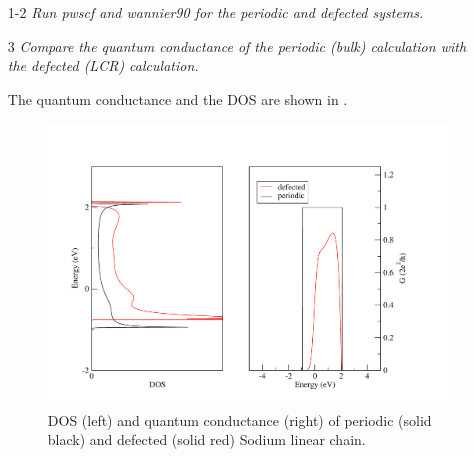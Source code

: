 \begin{enumerate}
\item [1-2] {\it Run pwscf and wannier90 for the periodic and defected systems.}

\item[3] {\it Compare the quantum conductance of the periodic (bulk) calculation with the defected (LCR) calculation.}

The quantum conductance and the DOS are shown in .

\begin{figure}[b!]
\centering
\includegraphics[width=1.0\columnwidth,height=0.5\columnwidth,trim={20pt 10pt 50pt 50pt},clip]{figure/example14/Na_chain_dos_qc.pdf}
\caption{DOS (left) and quantum conductance (right) of periodic (solid black) and defected (solid red) Sodium linear chain.}\label{fig14.2}
\end{figure}
\end{enumerate}
